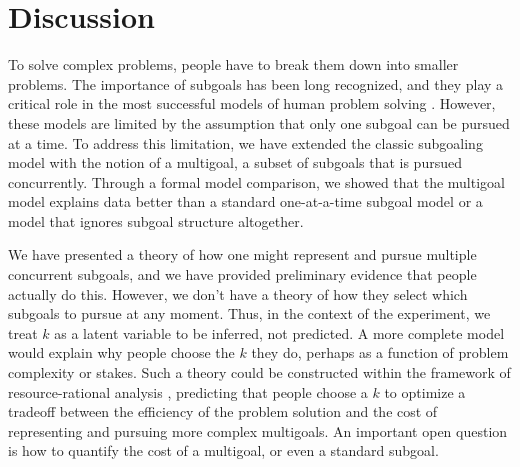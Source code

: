 \documentclass[10pt,letterpaper]{article}
\newcommand{\todo}[1]{\textcolor{red}{\textsc{[TODO: #1]}}}
\begin{document}


\section{Discussion}
  
To solve complex problems, people have to break them down into smaller problems. The importance of subgoals has been long recognized, and they play a critical role in the most successful models of human problem solving \citep{anderson2013architecture,NewellSimon1972,laird1987soar}. However, these models are limited by the assumption that only one subgoal can be pursued at a time. To address this limitation, we have extended the classic subgoaling model with the notion of a multigoal, a subset of subgoals that is pursued concurrently. Through a formal model comparison, we showed that the multigoal model explains data better than a standard one-at-a-time subgoal model or a model that ignores subgoal structure altogether.

We have presented a theory of how one might represent and pursue multiple concurrent subgoals, and we have provided preliminary evidence that people actually do this. However, we don't have a theory of how they select which subgoals to pursue at any moment. Thus, in the context of the experiment, we treat $k$ as a latent variable to be inferred, not predicted. A more complete model would explain why people choose the $k$ they do, perhaps as a function of problem complexity or stakes. Such a theory could be constructed within the framework of resource-rational analysis \citep{Griffiths2014}, predicting that people choose a $k$ to optimize a tradeoff between the efficiency of the problem solution and the cost of representing and pursuing more complex multigoals. An important open question is how to quantify the cost of a multigoal, or even a standard subgoal.
\end{document}
